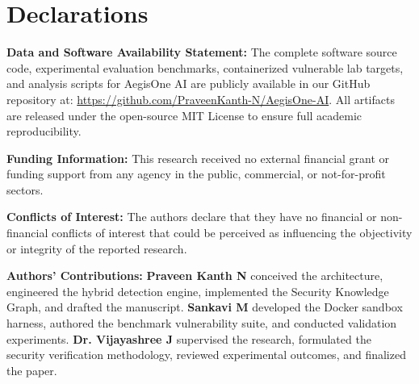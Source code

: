 \documentclass[journal,twoside]{IEEEtran}
\begin{document}
\section{Declarations}
\textbf{Data and Software Availability Statement:} The complete software source code, experimental evaluation benchmarks, containerized vulnerable lab targets, and analysis scripts for AegisOne AI are publicly available in our GitHub repository at: \url{https://github.com/PraveenKanth-N/AegisOne-AI}. All artifacts are released under the open-source MIT License to ensure full academic reproducibility.

\textbf{Funding Information:} This research received no external financial grant or funding support from any agency in the public, commercial, or not-for-profit sectors.

\textbf{Conflicts of Interest:} The authors declare that they have no financial or non-financial conflicts of interest that could be perceived as influencing the objectivity or integrity of the reported research.

\textbf{Authors' Contributions:} \textbf{Praveen Kanth N} conceived the architecture, engineered the hybrid detection engine, implemented the Security Knowledge Graph, and drafted the manuscript. \textbf{Sankavi M} developed the Docker sandbox harness, authored the benchmark vulnerability suite, and conducted validation experiments. \textbf{Dr. Vijayashree J} supervised the research, formulated the security verification methodology, reviewed experimental outcomes, and finalized the paper.
\end{document}
